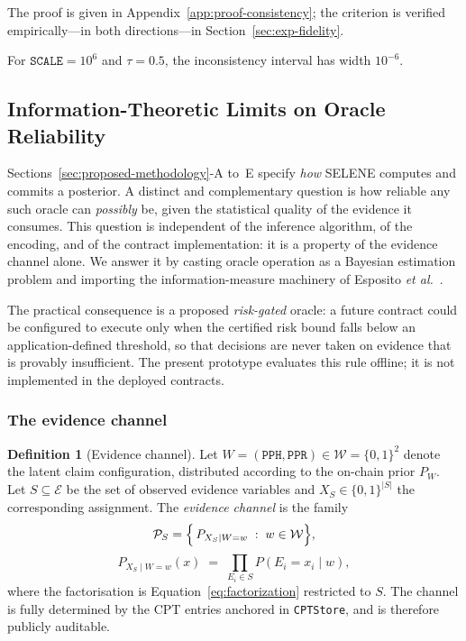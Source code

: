 \documentclass[journal]{IEEEtran}
\theoremstyle{definition}
\newtheorem{definition}{Definition}
\theoremstyle{remark}
\begin{document}
\noindent The proof is given in
Appendix~\ref{app:proof-consistency}; the criterion is
verified empirically---in both directions---in
Section~\ref{sec:exp-fidelity}.

For $\texttt{SCALE}=10^6$ and $\tau=0.5$, the
inconsistency interval has width $10^{-6}$.


\subsection{Information-Theoretic Limits on Oracle
Reliability}
\label{sec:theory-limits}

Sections~\ref{sec:proposed-methodology}-A to~E specify
\emph{how} SELENE computes and commits a posterior. A
distinct and complementary question is how reliable any
such oracle can \emph{possibly} be, given the statistical
quality of the evidence it consumes. This question is
independent of the inference algorithm, of the encoding,
and of the contract implementation: it is a property of
the evidence channel alone. We answer it by casting oracle
operation as a Bayesian estimation problem and importing
the information-measure machinery of Esposito
\emph{et al.}~\cite{esposito2024lower}.

The practical consequence is a proposed \emph{risk-gated}
oracle: a future contract could be configured to execute
only when the certified risk bound falls below an
application-defined threshold, so that decisions are never
taken on evidence that is provably insufficient. The
present prototype evaluates this rule offline; it is not
implemented in the deployed contracts.

\subsubsection{The evidence channel}

\begin{definition}[Evidence channel]
\label{def:evidence-channel}
Let $W=(\texttt{PPH},\texttt{PPR})\in\mathcal{W}=\{0,1\}^2$
denote the latent claim configuration, distributed
according to the on-chain prior $P_W$. Let
$S\subseteq\mathcal{E}$ be the set of observed evidence
variables and $X_S\in\{0,1\}^{|S|}$ the corresponding
assignment. The \emph{evidence channel} is the family
\[
  \mathcal{P}_S
  = \Bigl\{\, P_{X_S\mid W=w} \;:\; w\in\mathcal{W}
    \Bigr\},
\]
\[
  P_{X_S\mid W=w}(x)
  \;=\; \prod_{E_i\in S} P(E_i=x_i\mid w),
\]
where the factorisation is
Equation~\eqref{eq:factorization} restricted to $S$. The
channel is fully determined by the CPT entries anchored in
\texttt{CPTStore}, and is therefore publicly auditable.
\end{definition}
\end{document}
